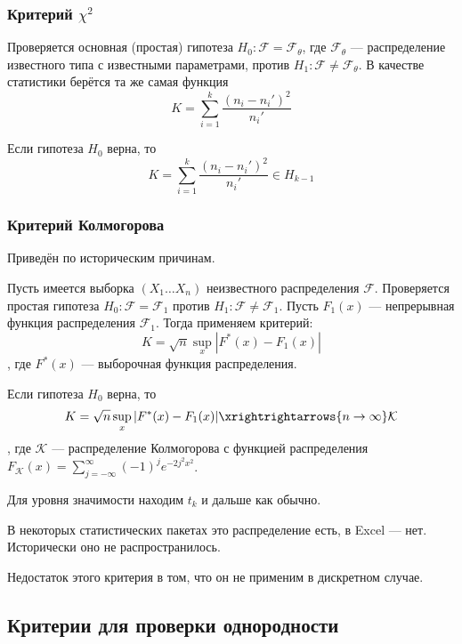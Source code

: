 \subsubsection{Критерий \(\chi^2\)}

Проверяется основная (простая) гипотеза \(H_0 : \mathcal{F} = \mathcal{F}_\theta\), где \(\mathcal{F}_\theta\) --- распределение известного типа с известными параметрами, против \(H_1 : \mathcal{F} \neq \mathcal{F}_\theta\). В качестве статистики берётся та же самая функция
\[K = \sum_{i=1}^{k} \frac{(n_i - n_i')^2}{n_i'}\]

\begin{theorem}[Парона\?]
    Если гипотеза \(H_0\) верна, то
    \[K = \sum_{i=1}^{k} \frac{(n_i - n_i')^2}{n_i'} \in H_{k - 1}\]
\end{theorem}


\subsubsection{Критерий Колмогорова}

Приведён по историческим причинам.

Пусть имеется выборка \((X_1 \dots X_n)\) неизвестного распределения \(\mathcal{F}\). Проверяется простая гипотеза \(H_0 : \mathcal{F} = \mathcal{F}_1\) против \(H_1 : \mathcal{F} \neq \mathcal{F}_1\). Пусть \(F_1(x)\) --- непрерывная функция распределения \(\mathcal{F}_1\). Тогда применяем критерий:
\[K = \sqrt{n} \sup_x |F^*(x) - F_1(x)|\]
, где \(F^*(x)\) --- выборочная функция распределения.

\begin{theorem}
    Если гипотеза \(H_0\) верна, то
    \[K = \sqrt{n} \sup_x |F^*(x) - F_1(x)| \xrightrightarrows{n \to \infty} \mathcal{K}\]
    , где \(\mathcal{K}\) --- распределение Колмогорова с функцией распределения \(F_{\mathcal{K}}(x) = \sum_{j=- \infty }^{\infty} ( - 1)^j e^{ - 2j^2x^2}\).
\end{theorem}

Для уровня значимости находим \(t_k\) и дальше как обычно.

В некоторых статистических пакетах это распределение есть, в Excel --- нет. Исторически оно не распространилось.

Недостаток этого критерия в том, что он не применим в дискретном случае.

\subsection{Критерии для проверки однородности}

